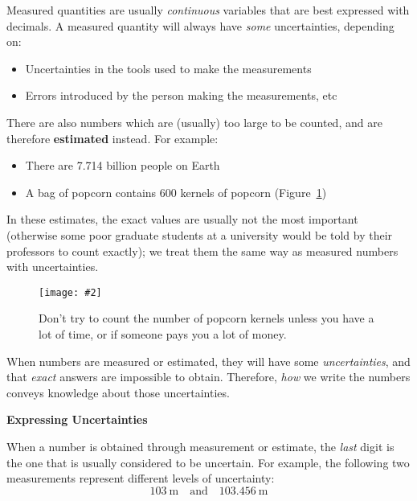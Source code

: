 \documentclass{../../oss-handout}
\newcommand{\pic}[2]{\texttt{[image: \#2]}}
\begin{document}
Measured quantities are usually \emph{continuous} variables that are best
expressed with decimals. A measured quantity will always have \emph{some}
uncertainties, depending on:
\begin{itemize}[nosep]
\item Uncertainties in the tools used to make the measurements
\item Errors introduced by the person making the measurements, etc
\end{itemize}
There are also numbers which are (usually) too large to be counted, and are
therefore \textbf{estimated} instead. For example:
\begin{itemize}[nosep]
\item There are 7.714 billion people on Earth
\item A bag of popcorn contains 600 kernels of popcorn
  (Figure~\ref{fig:popcorn})
\end{itemize}
In these estimates, the exact values are usually not the most important
(otherwise some poor graduate students at a university would be told by their
professors to count exactly); we treat them the same way as measured numbers
with uncertainties.
\begin{figure}[ht]
  \centering
  \pic{.45}{../graphics/popcorn}
  \caption{Don't try to count the number of popcorn kernels unless you have a
    lot of time, or if someone pays you a lot of money.}
  \label{fig:popcorn}
\end{figure}

When numbers are measured or estimated, they will have some
\emph{uncertainties}, and that \emph{exact} answers are impossible to obtain.
Therefore, \emph{how} we write the numbers conveys knowledge about those
uncertainties.
\newpage

\begin{center}
  \textbf{Expressing Uncertainties}
\end{center}
When a number is obtained through measurement or estimate, the \emph{last}
digit is the one that is usually considered to be uncertain. For example, the
following two measurements represent different levels of uncertainty:
\begin{equation*}
  \SI{103}{\metre}\quad\text{and}\quad\SI{103.456}{\metre}
\end{equation*}
\end{document}
